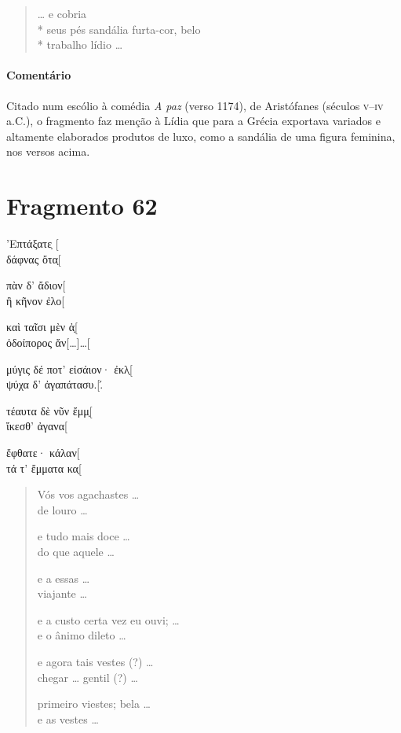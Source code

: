 \begin{verse}
\ldots{} e cobria\\*
seus pés sandália furta-cor, belo\\*
trabalho lídio \ldots{}
\end{verse}

{\paragraph{Comentário} Citado num escólio à comédia \textit{A paz} (verso 1174), de Aristófanes (séculos \textsc{v}--\textsc{iv} a.C.),
o fragmento faz menção à Lídia que para a Grécia exportava variados e altamente
elaborados produtos de luxo, como a sandália de uma figura feminina, nos versos acima.}


\pagebreak
\section{Fragmento 62}

\begin{gkverse}
’Επτάξατε̣ [\\
δάφνας ὄτα̣[

πὰν δ’ ἄδιον[\\
ἢ κῆνον ἐλο[

καὶ ταῖσι μὲν ἀ̣[\\
ὀδοίπορος ἄν[\ldots{}]\ldots{}[

μύγις δέ ποτ’ εἰσάιον· ἐκλ̣[\\
ψύχα δ’ ἀγαπάτασυ.[.́

τέαυτα δὲ νῦν ἔμμ̣[\\
ἴκεσθ’ ἀγανα[

ἔφθατε· κάλαν[\\
τά τ’ ἔμματα κα̣[
\end{gkverse}

\begin{verse}
Vós vos agachastes \ldots{}\\
de louro \ldots{}

e tudo mais doce \ldots{}\\
do que aquele \ldots{}

e a essas \ldots{}\\
viajante \ldots{}

e a custo certa vez eu ouvi; \ldots{}\\
e o ânimo dileto \ldots{}

e agora tais vestes (?) \ldots{}\\ 
chegar \ldots{} gentil (?) \ldots{}

primeiro viestes; bela \ldots{}\\ \EP[1]
e as vestes \ldots{}
\end{verse}


